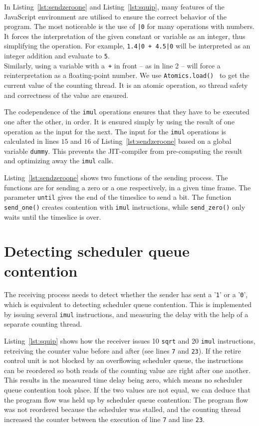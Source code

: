 \documentclass[11pt,
  titlepage=false,
  parskip=half,      %
]{scrreprt}
\begin{document}
In Listing~\ref{lst:sendzeroone} and Listing~\ref{lst:squip}, many features of the JavaScript environment are utilised to ensure the correct behavior of the program.
The most noticeable is the use of \texttt{|0} for many operations with numbers.
It forces the interpretation of the given constant or variable as an integer, thus simplifying the operation.
For example, \texttt{1.4|0 + 4.5|0} will be interpreted as an integer addition and evaluate to \texttt{5}. \\
Similarly, using a variable with a~\texttt{+} in front -- as in line 2 -- will force a reinterpretation as a floating-point number.
We use \texttt{Atomics.load()}~\cite{atomicsload} to get the current value of the counting thread.
It is an atomic operation, so thread safety and correctness of the value are ensured.

The codependence of the \texttt{imul} operations ensures that they have to be executed one after the other, in order.
It is ensured simply by using the result of one operation as the input for the next.
The input for the \texttt{imul} operations is calculated in lines $15$ and $16$ of Listing~\ref{lst:sendzeroone} based on a global variable \texttt{dummy}.
This prevents the JIT-compiler from pre-computing the result and optimizing away the \texttt{imul} calls.

Listing~\ref{lst:sendzeroone} shows two functions of the sending process.
The functions are for sending a zero or a one respectively, in a given time frame.
The parameter \texttt{until} gives the end of the timeslice to send a bit.
The function \texttt{send\_one()} creates contention with \texttt{imul} instructions,
while \texttt{send\_zero()} only waits until the timeslice is over.

\section{Detecting scheduler queue contention}
\label{sec:detect-sqc}
The receiving process needs to detect whether the sender has sent a '\texttt{1}' or a '\texttt{0}',
which is equivalent to detecting scheduler queue contention.
This is implemented by issuing several \texttt{imul} instructions,
and measuring the delay with the help of a separate counting thread.

Listing~\ref{lst:squip} shows how the receiver issues 10 \texttt{sqrt} and 20 \texttt{imul} instructions,
retreiving the counter value before and after (see lines \texttt{7} and \texttt{23}).
If the retire control unit is not blocked by an overflowing scheduler queue,
the instructions can be reordered so both reads of the counting value are right after one another.
This results in the measured time delay being zero, which means no scheduler queue contention took place.
If the two values are not equal, we can deduce that the program flow was held up by scheduler queue contention:
The program flow was not reordered because the scheduler was stalled, and the counting thread increased the counter
between the execution of line \texttt{7} and line \texttt{23}.
\end{document}

